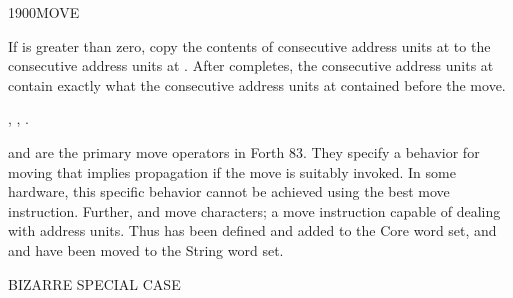 \begin{worddef}{1900}{MOVE}
\item {}

	If  is greater than zero, copy the contents of 
	consecutive address units at  to the 
	consecutive address units at . After 
	completes, the  consecutive address units at 
	contain exactly what the  consecutive address units at
	 contained before the move.

\see	{},
	,
	.

	\begin{rationale} %
		 and  are the primary
		move operators in Forth 83. They specify a behavior for moving
		that implies propagation if the move is suitably invoked. In
		some hardware, this specific behavior cannot be achieved using
		the best move instruction. Further,  and
		 move characters;  a move
		instruction capable of dealing with address units. Thus
		 has been defined and added to the Core word set,
		and  and  have been
		moved to the String word set.
	\end{rationale}

	\begin{testing} %
		 \hfill {} BIZARRE SPECIAL CASE \\

		 \\

		 \\

		 \\

		 \\

		 \\
	\end{testing}
\end{worddef}


